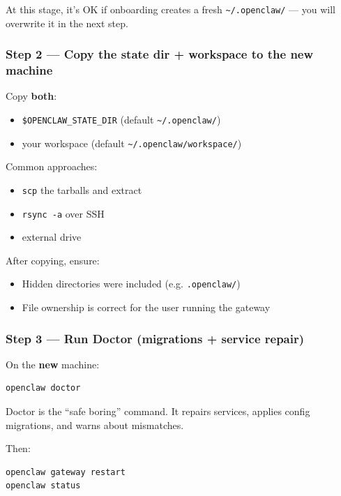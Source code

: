 At this stage, it’s OK if onboarding creates a fresh \texttt{\textasciitilde{}/.openclaw/} — you will overwrite it in the next step.

\subsubsection{Step 2 — Copy the state dir + workspace to the new machine}


Copy \textbf{both}:

\begin{itemize}
  \item \texttt{\$OPENCLAW\_STATE\_DIR} (default \texttt{\textasciitilde{}/.openclaw/})
  \item your workspace (default \texttt{\textasciitilde{}/.openclaw/workspace/})
\end{itemize}


Common approaches:

\begin{itemize}
  \item \texttt{scp} the tarballs and extract
  \item \texttt{rsync -a} over SSH
  \item external drive
\end{itemize}


After copying, ensure:

\begin{itemize}
  \item Hidden directories were included (e.g. \texttt{.openclaw/})
  \item File ownership is correct for the user running the gateway
\end{itemize}


\subsubsection{Step 3 — Run Doctor (migrations + service repair)}


On the \textbf{new} machine:

\begin{lstlisting}[language=bash]
openclaw doctor
\end{lstlisting}


Doctor is the “safe boring” command. It repairs services, applies config migrations, and warns about mismatches.

Then:

\begin{lstlisting}[language=bash]
openclaw gateway restart
openclaw status
\end{lstlisting}


